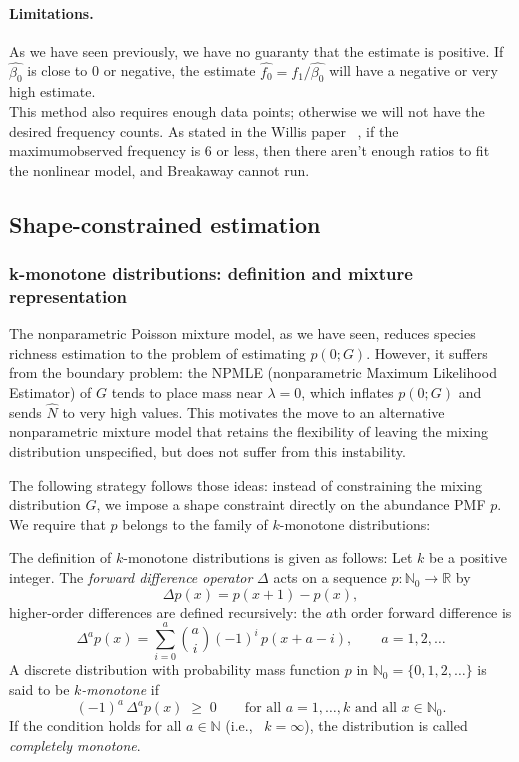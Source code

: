 ﻿\documentclass{article}
\begin{document}
\paragraph{Limitations.}
As we have seen previously, we have no guaranty that the estimate is positive. If $\hat{\beta_0}$ is close to 0 or negative, the estimate $\hat{f_0} = f_1/\hat{\beta_0}$ will have a negative or very high estimate.\\
This method also requires enough data points; otherwise we will not have the desired frequency counts. As stated in the Willis paper ~\cite{willisbunge2015}, if the maximumobserved frequency is 6 or less, then there aren't enough ratios to fit the nonlinear model, and Breakaway cannot run.


\subsection{Shape-constrained estimation}
 
\subsubsection{k-monotone distributions: definition and mixture representation}
The nonparametric Poisson mixture model, as we have seen, reduces species richness estimation to the problem of estimating $p(0;G)$. However, it suffers from the boundary problem: the NPMLE (nonparametric Maximum Likelihood Estimator) of $G$ tends to place mass near $\lambda = 0$, which inflates $p(0;G)$ and sends $\hat{N}$ to very high values. This motivates the move to an alternative nonparametric mixture model that retains the flexibility of leaving the mixing distribution unspecified, but does not suffer from this instability.

The following strategy follows those ideas: instead of constraining the mixing distribution $G$, we impose a shape constraint directly on the abundance PMF $p$. We require that $p$ belongs to the family of $k$-monotone distributions:

\vspace{1em}

The definition of $k$-monotone distributions is given as follows:
Let $k$ be a positive integer. The \emph{forward difference operator} $\Delta$ acts on a sequence $p \colon \mathbb{N}_0 \to \mathbb{R}$ by
\[
\Delta p(x) = p(x+1) - p(x),
\]
higher-order differences are defined recursively: the $a$th order forward difference is
\[
\Delta^a p(x) = \sum_{i=0}^{a} \binom{a}{i} (-1)^{i}\, p(x + a - i), \qquad a = 1, 2, \ldots
\]
A discrete distribution with probability mass function $p$ in $\mathbb{N}_0 = \{0, 1, 2, \ldots\}$ is said to be \emph{$k$-monotone} if
\[
(-1)^a \,\Delta^a p(x) \;\geq\; 0 \qquad \text{for all } a = 1, \ldots, k \text{ and all } x \in \mathbb{N}_0.
\]
If the condition holds for all $a \in \mathbb{N}$ (i.e., \ $k = \infty$), the distribution is called \emph{completely monotone}.
\end{document}

